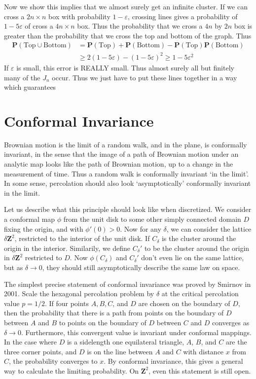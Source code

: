 Now we show this implies that we almost surely get an infinite cluster. If we can cross a $2n \times n$ box with probability $1 - \varepsilon$, crossing lines gives a probability of $1 - 5 \varepsilon$ of cross a $4n \times n$ box. Thus the probability that we cross a $4n$ by $2n$ box is greater than the probability that we cross the top and bottom of the graph. Thus
%
\begin{align*}
    \mathbf{P}(\text{Top} \cup \text{Bottom}) &= \mathbf{P}(\text{Top}) + \mathbf{P}(\text{Bottom}) - \mathbf{P}(\text{Top}) \mathbf{P}(\text{Bottom})\\
    &\geq 2(1 - 5\varepsilon) - (1 - 5\varepsilon)^2 \geq 1 - 5 \varepsilon^2
\end{align*}
%
If $\varepsilon$ is small, this error is REALLY small. Thus almost surely all but finitely many of the $J_n$ occur. Thus we just have to put these lines together in a way which guarantees

\section{Conformal Invariance}

Brownian motion is the limit of a random walk, and in the plane, is conformally invariant, in the sense that the image of a path of Brownian motion under an analytic map looks like the path of Brownian motion, up to a change in the measurement of time. Thus a random walk is conformally invariant `in the limit'. In some sense, percolation should also look `asymptotically' conformally invariant in the limit.

Let us describe what this principle should look like when discretized. We consider a conformal map $\phi$ from the unit disk to some other simply connected domain $D$ fixing the origin, and with $\phi'(0) > 0$. Now for any $\delta$, we can consider the lattice $\delta \mathbf{Z}^2$, restricted to the interior of the unit disk. If $C_\delta$ is the cluster around the origin in the interior. Similarily, we define $C_\delta'$ to be the cluster around the origin in $\delta \mathbf{Z}^2$ restricted to $D$. Now $\phi(C_\delta)$ and $C_\delta'$ don't even lie on the same lattice, but as $\delta \to 0$, they should still asymptotically describe the same law on space.

The simplest precise statement of conformal invariance was proved by Smirnov in 2001. Scale the hexagonal percolation problem by $\delta$ at the critical percolation value $p = 1/2$. If four points $A,B,C$, and $D$ are chosen on the boundary of $D$, then the probability that there is a path from points on the boundary of $D$ between $A$ and $B$ to points on the boundary of $D$ between $C$ and $D$ converges as $\delta \to 0$. Furthermore, this convergent value is invariant under conformal mappings. In the case where $D$ is a sidelength one equilateral triangle, $A$, $B$, and $C$ are the three corner points, and $D$ is on the line between $A$ and $C$ with distance $x$ from $C$, the probability converges to $x$. By conformal invariance, this gives a general way to calculate the limiting probability. On $\mathbf{Z}^2$, even this statement is still open.






